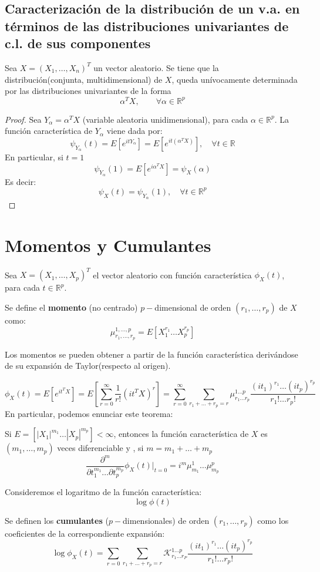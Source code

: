 \subsection{Caracterización de la distribución de un v.a. en términos de las distribuciones univariantes de c.l. de sus componentes}

\begin{nth}
  Sea $X = (X_1,\dots, X_n)^T$ un vector aleatorio. Se tiene que la distribución(conjunta, multidimensional) de $X$, queda unívocamente determinada por las distribuciones univariantes de la forma
  \[
\alpha ^T X, \quad \quad \forall \alpha \in \mathbb R ^p
  \]
\end{nth}
\begin{proof}
  Sea $Y_\alpha = \alpha^T X$ (variable aleatoria unidimensional), para cada $\alpha \in \mathbb R^p$. La función característica de $Y_\alpha$ viene dada por:
  \[
  \psi_{Y_\alpha}(t) = E[e^{itY_\alpha}] = E [e^{it(\alpha^T X)}], \quad \forall t \in \mathbb R
  \]
  En particular, si $t=1$
  \[
  \psi_{Y_\alpha}(1) = E[e^{i\alpha^T X}] = \psi_X (\alpha)
  \]
  Es decir:
  \[
  \psi_X(t) = \psi_{Y_\alpha}(1), \quad \forall t \in \mathbb R ^p
  \]
\end{proof}

\section{Momentos y Cumulantes}

Sea $X= (X_1,\dots,X_p)^T$ el vector aleatorio con función característica $\phi_X(t)$, para cada $t\in \mathbb R^p$.
\begin{ndef}
  Se define el \textbf{momento} (no centrado) $p-$dimensional de orden $(r_1, \dots, r_p)$ de $X$ como:
  \[
\mu_{r_1,\dots,r_p}^{1,\dots,p} = E [ X_1^{r_1} \dots X_p^{r_p}]
  \]
\end{ndef}

Los momentos se pueden obtener a partir de la función característica derivándose de su expansión de Taylor(respecto al origen).

\[
\phi_X(t) = E[e^{it^T X}] = E[\sum_{r=0}^\infty \frac{1}{r!}(i t^T X)^r] = \sum_{r= 0}^\infty \sum _{r_1+\dots + r_p = r} \mu_{r_1 \dots r_p}^{1 \dots p} \frac{(it_1)^{r_1} \dots (it_p)^{r_p}}{r_1 ! \dots r_p !}
\]
En particular, podemos enunciar este teorema:
\begin{nth}
  Si $E=[|X_1|^{m_1} \dots |X_p|^{m_p}] < \infty$, entonces la función característica de $X$ es $(m_1, \dots, m_p)$ veces diferenciable y , si $m = m_1 + \dots + m_p$
  \[
\frac{\partial ^m}{\partial t_1^{m_1} \dots \partial t_p^{m_p}} \phi_X(t)| _{t = 0} = i^m \mu_{m_1}^1 \dots \mu_{m_p}^p
  \]
\end{nth}

Consideremos el logaritmo de la función característica:
\[
\log \phi(t)
\]
\begin{ndef}
  Se definen los \textbf{cumulantes} ($p-$dimensionales) de orden $(r_1 , \dots, r_p)$ como los coeficientes de la correspondiente expansión:
  \[
  \log \phi_X(t) =  \sum_{r= 0} \sum_{r_1+\dots + r_p = r} \mathcal K_{r_1 \dots r_P}^{1\dots p} \frac{(it_1)^{r_1} \dots (it_p)^{r_p}}{r_1 ! \dots r_p !}
  \]
\end{ndef}
